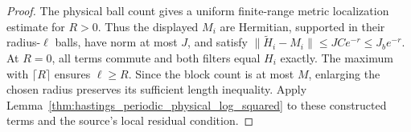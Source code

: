 \begin{proof}\leanok
    The physical ball count gives a uniform finite-range metric
    localization estimate for $R>0$. Thus the displayed $M_i$ are
    Hermitian, supported in their radius-$\ell$ balls, have norm at
    most $J$, and satisfy
    $\|\widetilde H_i-M_i\|\le JC e^{-r}\le J_b e^{-r}$.
    At $R=0$, all terms commute and both filters equal $H_i$ exactly.
    The maximum with $\lceil R\rceil$ ensures $\ell\ge R$.
    Since the block count is at most $M$, enlarging the chosen radius
    preserves its sufficient length inequality. Apply
    Lemma~\ref{thm:hastings_periodic_physical_log_squared} to these
    constructed terms and the source's local residual condition.
\end{proof}

